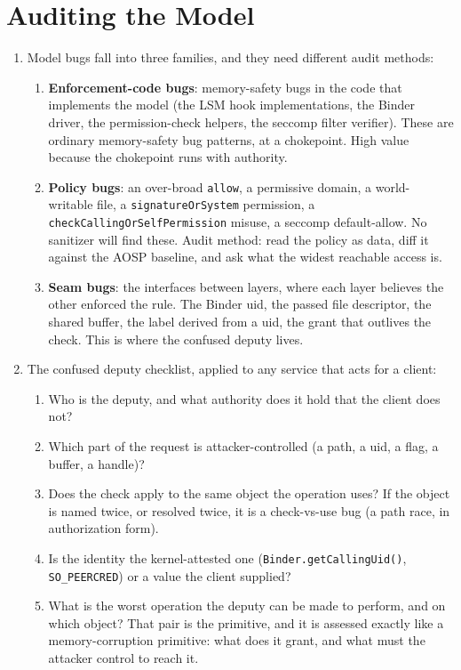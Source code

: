 \documentclass[12pt]{Training}
\begin{document}
\section*{Auditing the Model}
\begin{enumerate}
    \item Model bugs fall into three families, and they need different audit methods:
    \begin{enumerate}
        \item \textbf{Enforcement-code bugs}: memory-safety bugs in the code that implements the model (the LSM hook implementations, the Binder driver, the permission-check helpers, the seccomp filter verifier). These are ordinary memory-safety bug patterns, at a chokepoint. High value because the chokepoint runs with authority.
        \item \textbf{Policy bugs}: an over-broad \lstinline{allow}, a permissive domain, a world-writable file, a \lstinline{signatureOrSystem} permission, a \lstinline{checkCallingOrSelfPermission} misuse, a seccomp default-allow. No sanitizer will find these. Audit method: read the policy as data, diff it against the AOSP baseline, and ask what the widest reachable access is.
        \item \textbf{Seam bugs}: the interfaces between layers, where each layer believes the other enforced the rule. The Binder uid, the passed file descriptor, the shared buffer, the label derived from a uid, the grant that outlives the check. This is where the confused deputy lives.
    \end{enumerate}
    \item The confused deputy checklist, applied to any service that acts for a client:
    \begin{enumerate}
        \item Who is the deputy, and what authority does it hold that the client does not?
        \item Which part of the request is attacker-controlled (a path, a uid, a flag, a buffer, a handle)?
        \item Does the check apply to the same object the operation uses? If the object is named twice, or resolved twice, it is a check-vs-use bug (a path race, in authorization form).
        \item Is the identity the kernel-attested one (\lstinline{Binder.getCallingUid()}, \lstinline{SO_PEERCRED}) or a value the client supplied?
        \item What is the worst operation the deputy can be made to perform, and on which object? That pair is the primitive, and it is assessed exactly like a memory-corruption primitive: what does it grant, and what must the attacker control to reach it.

\end{enumerate}
\end{enumerate}
\end{document}
